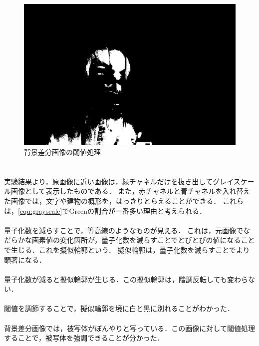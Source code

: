 \begin{figure}[h]
\begin{minipage}[b]{.49\textwidth}
\begin{minipage}[b]{.3\textwidth}
            \centering
            \includegraphics[keepaspectratio,width=\textwidth]{../../Figures/05_63.png}
        \end{minipage}
        \caption{背景差分画像の閾値処理}
    \end{minipage}
\end{figure}
\section{\consideration}
\paragraph{\kadaiaa}
実験結果より，原画像に近い画像は，緑チャネルだけを抜き出してグレイスケール画像として表示したものである．
また，赤チャネルと青チャネルを入れ替えた画像では，文字や建物の概形を，はっきりとらえることができる．
これらは，\eqref{equ:grayscale}でGreenの割合が一番多い理由と考えられる．
\paragraph{\kadaiab}
量子化数を減らすことで，等高線のようなものが見える．
これは，元画像でなだらかな画素値の変化箇所が，量子化数を減らすことでとびとびの値になることで生じる．これを擬似輪郭という．
擬似輪郭は，量子化数を減らすことでより顕著になる．
\paragraph{\kadaiac}
量子化数が減ると擬似輪郭が生じる．この擬似輪郭は，階調反転しても変わらない．
\paragraph{\kadaiad}
閾値を調節することで，擬似輪郭を境に白と黒に別れることがわかった．
\paragraph{\kadaiaf}
背景差分画像では，被写体がぼんやりと写っている．この画像に対して閾値処理することで，被写体を強調できることが分かった．
